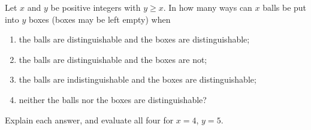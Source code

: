 Let $x$ and $y$ be positive integers with $y\ge x$. In how many ways can $x$ balls be put into $y$ boxes (boxes may be left empty) when
\begin{enumerate}
\item[(a)] the balls are distinguishable and the boxes are distinguishable;
\item[(b)] the balls are distinguishable and the boxes are not;
\item[(c)] the balls are indistinguishable and the boxes are distinguishable;
\item[(d)] neither the balls nor the boxes are distinguishable?
\end{enumerate}
Explain each answer, and evaluate all four for $x=4$, $y=5$.
